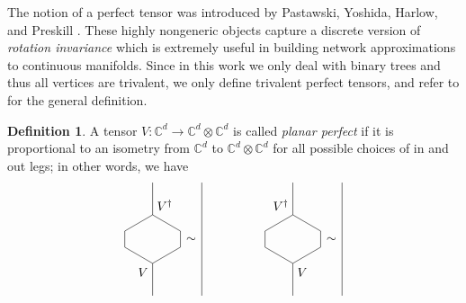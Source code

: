 \documentclass[11pt,oneside]{amsart}
\theoremstyle{plain}%
\theoremstyle{definition}
\newtheorem{definition}{Definition}[section]
\theoremstyle{remark}
\begin{document}
The notion of a perfect tensor was introduced by Pastawski, Yoshida, Harlow, and Preskill \cite{pastawski_holographic_2015}. These highly nongeneric objects capture a discrete version of \emph{rotation invariance} which is extremely useful in building network approximations to continuous manifolds. Since in this work we only deal with binary trees and thus all vertices are trivalent, we only define trivalent perfect tensors, and refer to \cite{pastawski_holographic_2015} for the general definition.

\begin{definition}
	A tensor $V\colon\mathbb{C}^d\to\mathbb{C}^d\otimes\mathbb{C}^d$ is called \emph{planar perfect} if it is proportional to an isometry from $\mathbb{C}^d$ to $\mathbb{C}^d\otimes\mathbb{C}^d$ for all possible choices of in and out legs; in other words, we have
	\begin{equation}
		\def\x{1.5}
		\begin{tikzpicture}[scale=0.6,baseline=-3mm]
			\draw (0, 0.5*\x) -- (0, 1.5*\x);
			\draw (0, 0.5*\x) -- (-1.5/1.73205*\x, 0) -- ++(0, -0.5*\x);
			\draw (0, 0.5*\x) -- (1.5/1.73205*\x, 0) -- ++(0, -0.5*\x);
			\node[above right] at (0, 0.5*\x) {$V^\dag$};
			\begin{scope}[yscale=-1, yshift=0.5*\x cm]
				\draw (0, 0.5*\x) -- (0, 1.5*\x);
				\draw (0, 0.5*\x) -- (-1.5/1.73205*\x, 0);
				\draw (0, 0.5*\x) -- (1.5/1.73205*\x, 0);
				\node[below left] at (0, 0.5*\x) {$V$};
			\end{scope}
		\end{tikzpicture}\,\sim\,
		\begin{tikzpicture}[scale=0.6,baseline=-3mm]
			\draw (0, -2*\x) -- (0, 1.5*\x);
		\end{tikzpicture}\mspace{90mu}
		\begin{tikzpicture}[scale=0.6,baseline=-3mm]
			\draw (0, 0.5*\x) -- (0, 1.5*\x);
			\draw (0, 0.5*\x) -- (-1.5/1.73205*\x, 0) -- ++(0, -0.5*\x);
			\draw (0, 0.5*\x) -- (1.5/1.73205*\x, 0) -- ++(0, -0.5*\x);
			\node[above left] at (0, 0.5*\x) {$V^\dag$};
			\begin{scope}[yscale=-1, yshift=0.5*\x cm]
				\draw (0, 0.5*\x) -- (0, 1.5*\x);
				\draw (0, 0.5*\x) -- (-1.5/1.73205*\x, 0);
				\draw (0, 0.5*\x) -- (1.5/1.73205*\x, 0);
				\node[below right] at (0, 0.5*\x) {$V$};
			\end{scope}
		\end{tikzpicture}\,\sim\,
		\begin{tikzpicture}[scale=0.6,baseline=-3mm]
			\draw (0, -2*\x) -- (0, 1.5*\x);

\end{tikzpicture}
\end{equation}
\end{definition}
\end{document}

